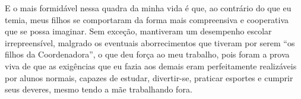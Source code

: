 E o mais formidável nessa quadra da minha vida é que, ao contrário do que eu temia, meus filhos se comportaram da forma mais compreensiva e cooperativa que se possa imaginar.
Sem exceção, mantiveram um desempenho escolar irrepreensível, malgrado os eventuais aborrecimentos que tiveram por serem ``os filhos da Coordenadora'', o que deu força ao meu trabalho, pois foram a prova viva de que as exigências que eu fazia aos demais eram perfeitamente realizáveis por alunos normais, capazes de estudar, divertir-se, praticar esportes e cumprir seus deveres, mesmo tendo a mãe trabalhando fora.